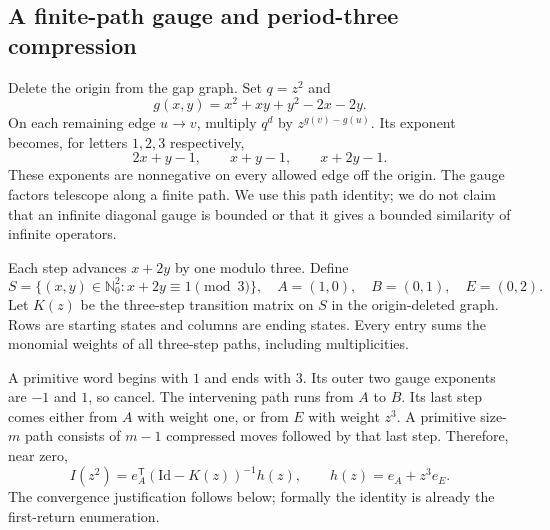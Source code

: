 \documentclass[11pt]{article}
\theoremstyle{definition}\newtheorem{definition}[theorem]{Definition}
\theoremstyle{remark}\newtheorem{remark}[theorem]{Remark}
\newcommand{\NN}{\mathbb N_0}
\newcommand{\Id}{\mathrm{Id}}
\begin{document}
\subsection{A finite-path gauge and period-three compression}
Delete the origin from the gap graph. Set $q=z^2$ and
\[
 g(x,y)=x^2+xy+y^2-2x-2y.
\]
On each remaining edge $u\to v$, multiply $q^d$ by $z^{g(v)-g(u)}$. Its exponent becomes, for letters $1,2,3$ respectively,
\begin{equation}\label{tdc:eq:gauged}
 2x+y-1,\qquad x+y-1,\qquad x+2y-1.
\end{equation}
These exponents are nonnegative on every allowed edge off the origin. The gauge factors telescope along a finite path. We use this path identity; we do not claim that an infinite diagonal gauge is bounded or that it gives a bounded similarity of infinite operators.

Each step advances $x+2y$ by one modulo three. Define
\[
 S=\{(x,y)\in\NN^2:x+2y\equiv1\pmod3\},\quad
 A=(1,0),\quad B=(0,1),\quad E=(0,2).
\]
Let $K(z)$ be the three-step transition matrix on $S$ in the origin-deleted graph. Rows are starting states and columns are ending states. Every entry sums the monomial weights of all three-step paths, including multiplicities.

A primitive word begins with $1$ and ends with $3$. Its outer two gauge exponents are $-1$ and $1$, so cancel. The intervening path runs from $A$ to $B$. Its last step comes either from $A$ with weight one, or from $E$ with weight $z^3$. A primitive size-$m$ path consists of $m-1$ compressed moves followed by that last step. Therefore, near zero,
\begin{equation}\label{tdc:eq:resolventI}
 I(z^2)=e_A^{\mathsf T}(\Id-K(z))^{-1}h(z),\qquad
 h(z)=e_A+z^3e_E.
\end{equation}
The convergence justification follows below; formally the identity is already the first-return enumeration.
\end{document}
